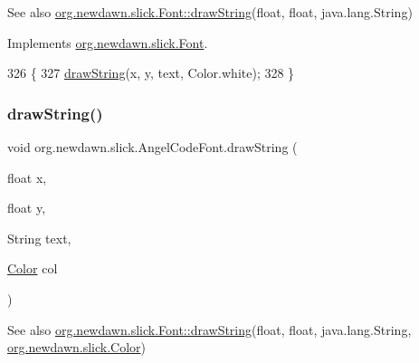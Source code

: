 \begin{DoxySeeAlso}{See also}
\mbox{\hyperlink{interfaceorg_1_1newdawn_1_1slick_1_1_font_a40b19381efcb64ce1ce4d446eff1e350}{org.\+newdawn.\+slick.\+Font\+::draw\+String}}(float, float, java.\+lang.\+String) 
\end{DoxySeeAlso}


Implements \mbox{\hyperlink{interfaceorg_1_1newdawn_1_1slick_1_1_font_a40b19381efcb64ce1ce4d446eff1e350}{org.\+newdawn.\+slick.\+Font}}.


\begin{DoxyCode}
326                                                           \{
327         \mbox{\hyperlink{classorg_1_1newdawn_1_1slick_1_1_angel_code_font_a8cc06c81dd2f11c47844d863a03e3433}{drawString}}(x, y, text, Color.white);
328     \}
\end{DoxyCode}
\mbox{\label{classorg_1_1newdawn_1_1slick_1_1_angel_code_font_a8067ec0d8027311bbcc16aaec1421b2d}} 
\subsubsection{\texorpdfstring{draw\+String()}{drawString()}\hspace{0.1cm}{\footnotesize\ttfamily [2/3]}}
{\footnotesize\ttfamily void org.\+newdawn.\+slick.\+Angel\+Code\+Font.\+draw\+String (\begin{DoxyParamCaption}\item[{float}]{x,  }\item[{float}]{y,  }\item[{String}]{text,  }\item[{\mbox{\hyperlink{classorg_1_1newdawn_1_1slick_1_1_color}{Color}}}]{col }\end{DoxyParamCaption})\hspace{0.3cm}{\ttfamily [inline]}}

\begin{DoxySeeAlso}{See also}
\mbox{\hyperlink{interfaceorg_1_1newdawn_1_1slick_1_1_font_a40b19381efcb64ce1ce4d446eff1e350}{org.\+newdawn.\+slick.\+Font\+::draw\+String}}(float, float, java.\+lang.\+String, \mbox{\hyperlink{classorg_1_1newdawn_1_1slick_1_1_color}{org.\+newdawn.\+slick.\+Color}}) 
\end{DoxySeeAlso}


